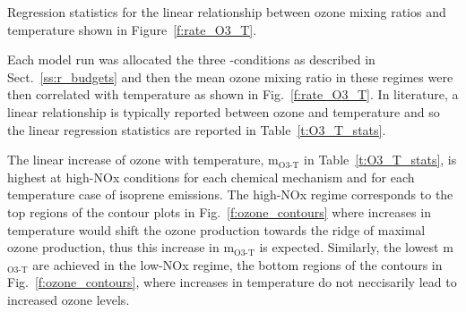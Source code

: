 \begin{table}%
    \centering%
    \caption{Regression statistics for the linear relationship between ozone mixing ratios and temperature shown in Figure~\ref{f:rate_O3_T}.}%
    \label{t:O3_T_stats}%
    
\end{table}

Each model run was allocated the three -conditions as described in Sect.~\ref{ss:r_budgets} and then the mean ozone mixing ratio in these  regimes were then correlated with temperature as shown in Fig.~\ref{f:rate_O3_T}.
In literature, a linear relationship is typically reported between ozone and temperature and so the linear regression statistics are reported in Table~\ref{t:O3_T_stats}.

The linear increase of ozone with temperature, m$_{\text{O3-T}}$ in Table~\ref{t:O3_T_stats}, is highest at high-NOx conditions for each chemical mechanism and for each temperature case of isoprene emissions.
The high-NOx regime corresponds to the top regions of the contour plots in Fig.~\ref{f:ozone_contours} where increases in temperature would shift the ozone production towards the ridge of maximal ozone production, thus this increase in m$_{\text{O3-T}}$ is expected.
Similarly, the lowest m$_{\text{O3-T}}$ are achieved in the low-NOx regime, the bottom regions of the contours in Fig.~\ref{f:ozone_contours}, where increases in temperature do not neccisarily lead to increased ozone levels.
